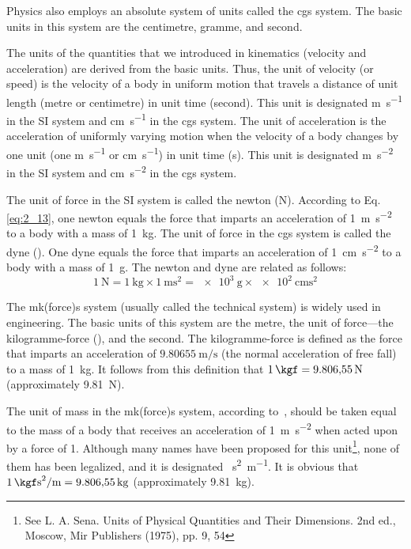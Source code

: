 Physics also employs an absolute system of units called the cgs system. The basic units in this system are the centimetre, gramme, and second.

The units of the quantities that we introduced in kinematics (velocity and acceleration) are derived from the basic units. Thus, the unit of velocity (or speed) is the velocity of a body in uniform motion that travels a distance of unit length (metre or centimetre) in unit time (second). This unit is designated \si{\metre\per\second} in the SI system and \si{\centi\metre\per\second} in the cgs system. The unit of acceleration is the acceleration of uniformly varying motion when the velocity of a body changes by one unit (one \si{\metre\per\second} or \si{\centi\metre\per\second}) in unit time (\si{\second}). This unit is designated \si{\metre\per\square\second} in the SI system and \si{\centi\metre\per\square\second} in the cgs system.

The unit of force in the SI system is called the newton (\si{\newton}). According to Eq. \eqref{eq:2_13}, one newton equals the force that imparts an acceleration of \SI{1}{\metre\per\square\second} to a body with a mass of \SI{1}{\kilo\gram}. The unit of force in the cgs system is called the dyne (\si{\dyne}). One dyne equals the force that imparts an acceleration of \SI{1}{\centi\metre\per\square\second} to a body with a mass of \SI{1}{\gram}. The newton and dyne are related as follows:
\begin{equation*}
\SI{1}{\newton} = \SI{1}{\kilo\gram} \times \SI{1}{\metre\square\second} = \SI{e3}{\gram} \times \SI{e2}{\centi\metre\square\second}
\end{equation*}

The mk(force)s system (usually called the technical system) is widely used in engineering. The basic units of this system are the metre, the unit of force---the kilogramme-force (\si{\kgf}), and the second. The kilogramme-force is defined as the force that imparts an acceleration of $\SI{9.80655}{\metre\per\second}$ (the normal acceleration of free fall) to a mass of \SI{1}{\kilo\gram}. It follows from this definition that $\SI{1}{\kgf}=\SI{9.80655}{\newton}$ (approximately \SI{9.81}{\newton}).

The unit of mass in the mk(force)s system, according to~, should be taken equal to the mass of a body that receives an acceleration of \SI{1}{\metre\per\square\second} when acted upon by a force of \SI{1}{\kgf}. Although many names have been proposed for this unit\footnote{See L. A. Sena. Units of Physical Quantities and Their Dimensions. 2nd ed., Moscow, Mir Publishers (1975), pp. 9, 54}, none of them has been legalized, and it is designated \si{\kgf\second\squared\per\metre}. It is obvious that $\SI{1}{\kgf\second\squared\per\metre}=\SI{9.80655}{\kilo\gram}$ (approximately \SI{9.81}{\kilo\gram}).

